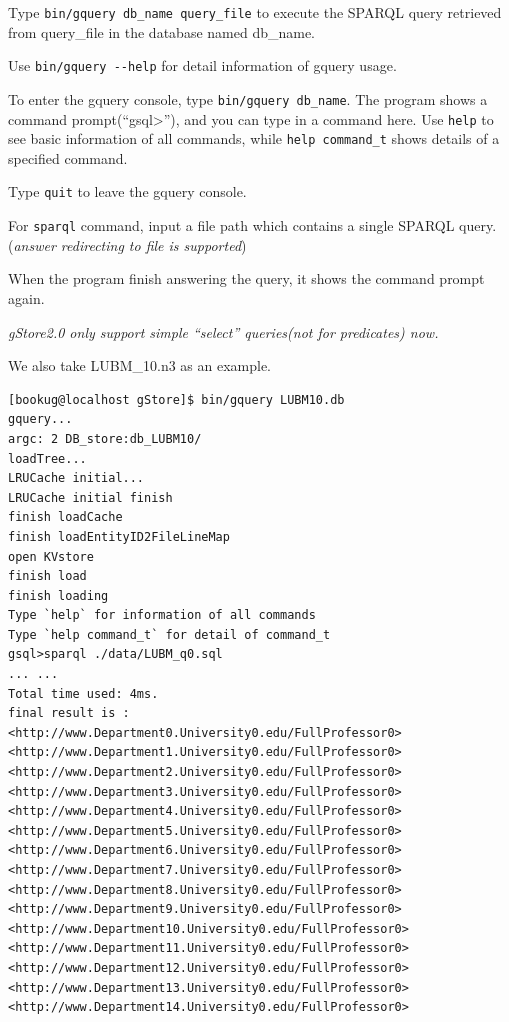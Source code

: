 \documentclass[titlepage, a4paper, 12pt]{article}
\begin{document}
Type \texttt{bin/gquery\ db\_name\ query\_file} to execute the SPARQL
query retrieved from query\_file in the database named db\_name.

Use \texttt{bin/gquery\ -\/-help} for detail information of gquery
usage.

To enter the gquery console, type \texttt{bin/gquery\ db\_name}. The
program shows a command prompt(``gsql\textgreater{}''), and you can type
in a command here. Use \texttt{help} to see basic information of all
commands, while \texttt{help\ command\_t} shows details of a specified
command.

Type \texttt{quit} to leave the gquery console.

For \texttt{sparql} command, input a file path which contains a single
SPARQL query. (\emph{answer redirecting to file is supported})

When the program finish answering the query, it shows the command prompt
again.

\emph{gStore2.0 only support simple ``select'' queries(not for
predicates) now.}

We also take LUBM\_10.n3 as an example.

\begin{verbatim}
[bookug@localhost gStore]$ bin/gquery LUBM10.db
gquery...
argc: 2 DB_store:db_LUBM10/
loadTree...
LRUCache initial...
LRUCache initial finish
finish loadCache
finish loadEntityID2FileLineMap
open KVstore
finish load
finish loading
Type `help` for information of all commands
Type `help command_t` for detail of command_t
gsql>sparql ./data/LUBM_q0.sql
... ...
Total time used: 4ms.
final result is :
<http://www.Department0.University0.edu/FullProfessor0>
<http://www.Department1.University0.edu/FullProfessor0>
<http://www.Department2.University0.edu/FullProfessor0>
<http://www.Department3.University0.edu/FullProfessor0>
<http://www.Department4.University0.edu/FullProfessor0>
<http://www.Department5.University0.edu/FullProfessor0>
<http://www.Department6.University0.edu/FullProfessor0>
<http://www.Department7.University0.edu/FullProfessor0>
<http://www.Department8.University0.edu/FullProfessor0>
<http://www.Department9.University0.edu/FullProfessor0>
<http://www.Department10.University0.edu/FullProfessor0>
<http://www.Department11.University0.edu/FullProfessor0>
<http://www.Department12.University0.edu/FullProfessor0>
<http://www.Department13.University0.edu/FullProfessor0>
<http://www.Department14.University0.edu/FullProfessor0>
\end{verbatim}
\end{document}
